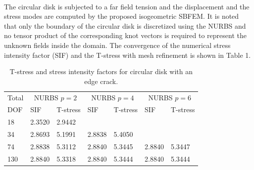 \paragraph{}
The circular disk is subjected to a far field tension and the displacement and the stress modes are computed by the proposed isogeometric SBFEM.
It is noted that only the boundary of the circular disk is discretized using the NURBS and no tensor product of the corresponding knot vectors is required to represent the unknown fields inside the domain.
The convergence of the numerical stress intensity factor (SIF) and the T-stress with mesh refinement is shown in Table 1.

\begin{table}[]
\caption{T-stress and stress intensity factors for circular disk with an edge crack.}
\label{iso_tab:circular_disk_res}
\begin{tabularx}{\textwidth}{XXXXXXX}
\toprule
    Total    &   \multicolumn{2}{c}{NURBS $p=2$} &\multicolumn{2}{c}{NURBS $p=4$} &\multicolumn{2}{c}{NURBS $p=6$}\\
    \cmidrule{2-7}
    DOF      &   SIF     &   T-stress            &SIF     &   T-stress            &SIF     &   T-stress           \\
    \cmidrule{1-1} \cmidrule{2-3} \cmidrule{4-5} \cmidrule{6-7}
    18       &   2.3520  &   2.9442              &        &                       &        &                      \\
    34       &   2.8693  &   5.1991              &2.8838  &5.4050                 &        &                      \\
    74       &   2.8838  &   5.3112              &2.8840  &5.3445                 &2.8840  &5.3447                \\
    130      &   2.8840  &   5.3318              &2.8840  &5.3444                 &2.8840  &5.3444                \\
\bottomrule
\end{tabularx}
\end{table}

